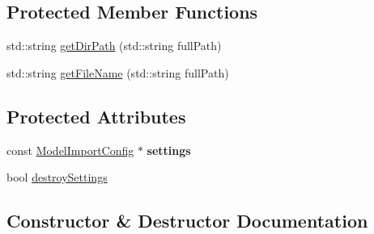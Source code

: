 \subsection*{Protected Member Functions}
\begin{DoxyCompactItemize}
\item 
std\+::string \hyperlink{classrepo_1_1manipulator_1_1modelconvertor_1_1_abstract_model_import_a60b7f33101fe224ed25bd6b5d3f28ed5}{get\+Dir\+Path} (std\+::string full\+Path)
\item 
std\+::string \hyperlink{classrepo_1_1manipulator_1_1modelconvertor_1_1_abstract_model_import_adc928030621a646bee974229e741d43c}{get\+File\+Name} (std\+::string full\+Path)
\end{DoxyCompactItemize}
\subsection*{Protected Attributes}
\begin{DoxyCompactItemize}
\item 
\hypertarget{classrepo_1_1manipulator_1_1modelconvertor_1_1_abstract_model_import_ac32521c869840f34fbba44484d1d8ba5}{}const \hyperlink{classrepo_1_1manipulator_1_1modelconvertor_1_1_model_import_config}{Model\+Import\+Config} $\ast$ {\bfseries settings}\label{classrepo_1_1manipulator_1_1modelconvertor_1_1_abstract_model_import_ac32521c869840f34fbba44484d1d8ba5}

\item 
bool \hyperlink{classrepo_1_1manipulator_1_1modelconvertor_1_1_abstract_model_import_a9fd7153ec1348d4836f542f5bd51bfa5}{destroy\+Settings}
\end{DoxyCompactItemize}


\subsection{Constructor \& Destructor Documentation}
\hypertarget{classrepo_1_1manipulator_1_1modelconvertor_1_1_abstract_model_import_a45ba12f9052b3cca1f1564bd5a05a8d8}{}
